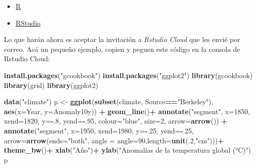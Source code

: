 \documentclass[]{article}
\newenvironment{Shaded}{\begin{snugshade}}{\end{snugshade}}
\newcommand{\DataTypeTok}[1]{\textcolor[rgb]{0.13,0.29,0.53}{#1}}
\newcommand{\DecValTok}[1]{\textcolor[rgb]{0.00,0.00,0.81}{#1}}
\newcommand{\KeywordTok}[1]{\textcolor[rgb]{0.13,0.29,0.53}{\textbf{#1}}}
\newcommand{\NormalTok}[1]{#1}
\newcommand{\OperatorTok}[1]{\textcolor[rgb]{0.81,0.36,0.00}{\textbf{#1}}}
\newcommand{\StringTok}[1]{\textcolor[rgb]{0.31,0.60,0.02}{#1}}
\providecommand{\tightlist}{%
  \setlength{\itemsep}{0pt}\setlength{\parskip}{0pt}}
\begin{document}
\begin{itemize}
\tightlist
\item
  \href{https://www.r-project.org/}{R}
\item
  \href{https://rstudio.com/}{RStudio}
\end{itemize}

Lo que harán ahora es aceptar la invitación a \emph{Rstudio Cloud} que
les envié por correo. Acá un pequeño ejemplo, copien y peguen este
código en la consola de Rstudio Cloud:

\begin{Shaded}
\begin{Highlighting}[]
\KeywordTok{install.packages}\NormalTok{(}\StringTok{"gcookbook"}\NormalTok{)}
\KeywordTok{install.packages}\NormalTok{(}\StringTok{"ggplot2"}\NormalTok{)}
\KeywordTok{library}\NormalTok{(gcookbook)}
\KeywordTok{library}\NormalTok{(grid)}
\KeywordTok{library}\NormalTok{(ggplot2)}

\KeywordTok{data}\NormalTok{(}\StringTok{"climate"}\NormalTok{)}
\NormalTok{p <-}\StringTok{ }\KeywordTok{ggplot}\NormalTok{(}\KeywordTok{subset}\NormalTok{(climate, Source}\OperatorTok{==}\StringTok{"Berkeley"}\NormalTok{), }\KeywordTok{aes}\NormalTok{(}\DataTypeTok{x=}\NormalTok{Year, }\DataTypeTok{y=}\NormalTok{Anomaly10y)) }\OperatorTok{+}
\StringTok{      }\KeywordTok{geom_line}\NormalTok{()}\OperatorTok{+}
\StringTok{      }\KeywordTok{annotate}\NormalTok{(}\StringTok{"segment"}\NormalTok{, }\DataTypeTok{x=}\DecValTok{1850}\NormalTok{, }\DataTypeTok{xend=}\DecValTok{1820}\NormalTok{, }\DataTypeTok{y=}\OperatorTok{-}\NormalTok{.}\DecValTok{8}\NormalTok{, }\DataTypeTok{yend=}\OperatorTok{-}\NormalTok{.}\DecValTok{95}\NormalTok{, }\DataTypeTok{colour=}\StringTok{"blue"}\NormalTok{, }\DataTypeTok{size=}\DecValTok{2}\NormalTok{, }\DataTypeTok{arrow=}\KeywordTok{arrow}\NormalTok{()) }\OperatorTok{+}
\StringTok{      }\KeywordTok{annotate}\NormalTok{(}\StringTok{"segment"}\NormalTok{, }\DataTypeTok{x=}\DecValTok{1950}\NormalTok{, }\DataTypeTok{xend=}\DecValTok{1980}\NormalTok{, }\DataTypeTok{y=}\OperatorTok{-}\NormalTok{.}\DecValTok{25}\NormalTok{, }\DataTypeTok{yend=}\OperatorTok{-}\NormalTok{.}\DecValTok{25}\NormalTok{, }\DataTypeTok{arrow=}\KeywordTok{arrow}\NormalTok{(}\DataTypeTok{ends=}\StringTok{"both"}\NormalTok{, }\DataTypeTok{angle =} \DataTypeTok{angle=}\DecValTok{90}\NormalTok{,}\DataTypeTok{length=}\KeywordTok{unit}\NormalTok{(.}\DecValTok{2}\NormalTok{,}\StringTok{"cm"}\NormalTok{)))}\OperatorTok{+}
\StringTok{      }\KeywordTok{theme_bw}\NormalTok{()}\OperatorTok{+}
\StringTok{      }\KeywordTok{xlab}\NormalTok{(}\StringTok{"Año"}\NormalTok{)}\OperatorTok{+}
\StringTok{      }\KeywordTok{ylab}\NormalTok{(}\StringTok{"Anomalías de la temperatura global (°C)"}\NormalTok{)}
\NormalTok{p  }
\end{Highlighting}
\end{Shaded}
\end{document}
